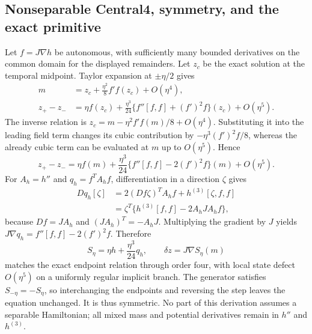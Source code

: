 \subsection{Nonseparable Central4, symmetry, and the exact primitive}
Let $f=J\nabla h$ be autonomous, with sufficiently many bounded derivatives on the common domain for the displayed remainders. Let $z_c$ be the exact solution at the temporal midpoint. Taylor expansion at $\pm\eta/2$ gives
\begin{align}
 m&=z_c+\frac{\eta^2}{8}f'f(z_c)+O(\eta^4),\\
 z_+-z_-&=\eta f(z_c)+\frac{\eta^3}{24}\{f''[f,f]+(f')^2f\}(z_c)+O(\eta^5).
 \label{eq:sup-central-taylor}
\end{align}
The inverse relation is $z_c=m-\eta^2f'f(m)/8+O(\eta^4)$. Substituting it into the leading field term changes its cubic contribution by $-\eta^3(f')^2f/8$, whereas the already cubic term can be evaluated at $m$ up to $O(\eta^5)$. Hence
\begin{equation}
 z_+-z_-=\eta f(m)+\frac{\eta^3}{24}\{f''[f,f]-2(f')^2f\}(m)+O(\eta^5).
 \label{eq:sup-central-elimination}
\end{equation}
For $A_h=h''$ and $q_h=f^TA_hf$, differentiation in a direction $\zeta$ gives
\begin{align}
 Dq_h[\zeta]
 &=2(Df\zeta)^TA_hf+h^{(3)}[\zeta,f,f]\\
 &=\zeta^T\{h^{(3)}[f,f]-2A_hJA_hf\},
 \label{eq:sup-central-derivative}
\end{align}
because $Df=JA_h$ and $(JA_h)^T=-A_hJ$. Multiplying the gradient by $J$ yields $J\nabla q_h=f''[f,f]-2(f')^2f$. Therefore
\begin{equation}
 S_\eta=\eta h+\frac{\eta^3}{24}q_h,\qquad
 \delta z=J\nabla S_\eta(m)
 \label{eq:sup-central4-method}
\end{equation}
matches the exact endpoint relation through order four, with local state defect $O(\eta^5)$ on a uniformly regular implicit branch. The generator satisfies $S_{-\eta}=-S_\eta$, so interchanging the endpoints and reversing the step leaves the equation unchanged. It is thus symmetric. No part of this derivation assumes a separable Hamiltonian; all mixed mass and potential derivatives remain in $h''$ and $h^{(3)}$.

